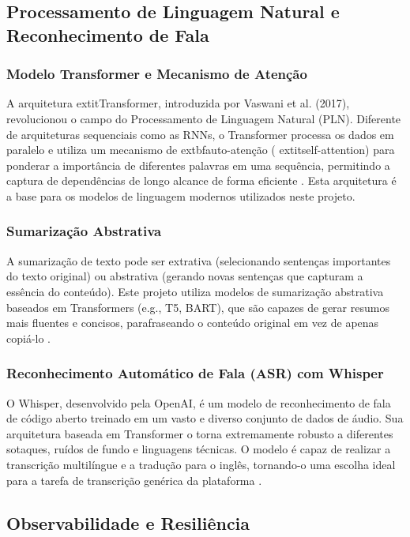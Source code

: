 \subsection{Processamento de Linguagem Natural e Reconhecimento de Fala}

\subsubsection{Modelo Transformer e Mecanismo de Atenção}
A arquitetura 	extit{Transformer}, introduzida por Vaswani et al. (2017), revolucionou o campo do Processamento de Linguagem Natural (PLN). Diferente de arquiteturas sequenciais como as RNNs, o Transformer processa os dados em paralelo e utiliza um mecanismo de 	extbf{auto-atenção} (	extit{self-attention}) para ponderar a importância de diferentes palavras em uma sequência, permitindo a captura de dependências de longo alcance de forma eficiente \cite{vaswani2017attention}. Esta arquitetura é a base para os modelos de linguagem modernos utilizados neste projeto.

\subsubsection{Sumarização Abstrativa}
A sumarização de texto pode ser extrativa (selecionando sentenças importantes do texto original) ou abstrativa (gerando novas sentenças que capturam a essência do conteúdo). Este projeto utiliza modelos de sumarização abstrativa baseados em Transformers (e.g., T5, BART), que são capazes de gerar resumos mais fluentes e concisos, parafraseando o conteúdo original em vez de apenas copiá-lo \cite{lewis2019bart}.

\subsubsection{Reconhecimento Automático de Fala (ASR) com Whisper}
O Whisper, desenvolvido pela OpenAI, é um modelo de reconhecimento de fala de código aberto treinado em um vasto e diverso conjunto de dados de áudio. Sua arquitetura baseada em Transformer o torna extremamente robusto a diferentes sotaques, ruídos de fundo e linguagens técnicas. O modelo é capaz de realizar a transcrição multilíngue e a tradução para o inglês, tornando-o uma escolha ideal para a tarefa de transcrição genérica da plataforma \cite{radford2023robust}.

\subsection{Observabilidade e Resiliência}

